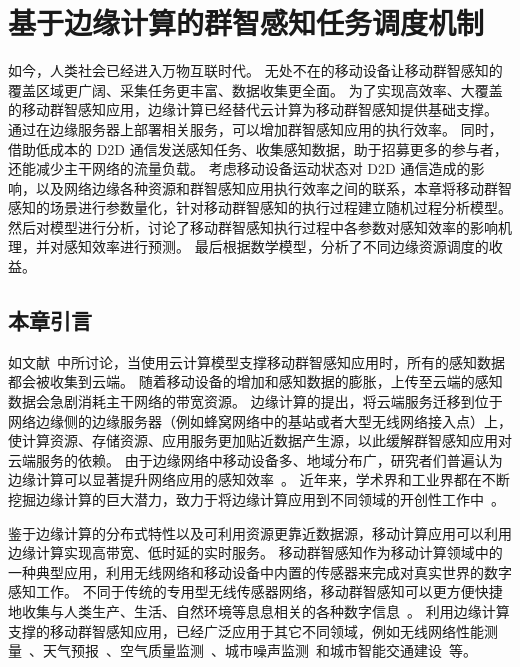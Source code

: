 

\chapter{基于边缘计算的群智感知任务调度机制}

如今，人类社会已经进入万物互联时代。
无处不在的移动设备让移动群智感知的覆盖区域更广阔、采集任务更丰富、数据收集更全面。
为了实现高效率、大覆盖的移动群智感知应用，边缘计算已经替代云计算为移动群智感知提供基础支撑。
通过在边缘服务器上部署相关服务，可以增加群智感知应用的执行效率。
同时，借助低成本的 D2D 通信发送感知任务、收集感知数据，助于招募更多的参与者，还能减少主干网络的流量负载。
考虑移动设备运动状态对 D2D 通信造成的影响，以及网络边缘各种资源和群智感知应用执行效率之间的联系，本章将移动群智感知的场景进行参数量化，针对移动群智感知的执行过程建立随机过程分析模型。
然后对模型进行分析，讨论了移动群智感知执行过程中各参数对感知效率的影响机理，并对感知效率进行预测。
最后根据数学模型，分析了不同边缘资源调度的收益。

\section{本章引言}

如文献~中所讨论，当使用云计算模型支撑移动群智感知应用时，所有的感知数据都会被收集到云端。
随着移动设备的增加和感知数据的膨胀，上传至云端的感知数据会急剧消耗主干网络的带宽资源。
边缘计算的提出，将云端服务迁移到位于网络边缘侧的边缘服务器（例如蜂窝网络中的基站或者大型无线网络接入点）上，使计算资源、存储资源、应用服务更加贴近数据产生源，以此缓解群智感知应用对云端服务的依赖。
由于边缘网络中移动设备多、地域分布广，研究者们普遍认为边缘计算可以显著提升网络应用的感知效率~\cite{DBLP:conf/sigcomm/BonomiMZA12}。
近年来，学术界和工业界都在不断挖掘边缘计算的巨大潜力，致力于将边缘计算应用到不同领域的开创性工作中~\cite{DBLP:journals/access/MarjanovicAZ18,DBLP:journals/iotj/ChiangZ16}。


鉴于边缘计算的分布式特性以及可利用资源更靠近数据源，移动计算应用可以利用边缘计算实现高带宽、低时延的实时服务。
移动群智感知作为移动计算领域中的一种典型应用，利用无线网络和移动设备中内置的传感器来完成对真实世界的数字感知工作。
不同于传统的专用型无线传感器网络，移动群智感知可以更方便快捷地收集与人类生产、生活、自然环境等息息相关的各种数字信息~\cite{DBLP:journals/cm/GuoCZYC16}。
利用边缘计算支撑的移动群智感知应用，已经广泛应用于其它不同领域，例如无线网络性能测量~\cite{DBLP:journals/cm/RosenLLCMB14}、天气预报~\cite{DBLP:journals/tpds/ZhaoMTL15}、空气质量监测~\cite{DBLP:conf/huc/ZhangXWC14}、城市噪声监测~\cite{DBLP:conf/huc/ZhengLWZLC14}和城市智能交通建设~\cite{DBLP:conf/icdcs/ZhouJL15}等。

